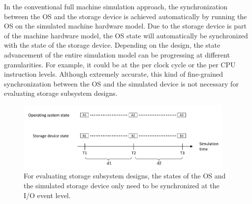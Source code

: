 In the conventional full machine simulation approach, the synchronization between the OS and the storage device is achieved automatically by running the OS on the simulated machine hardware model. Due to the storage device is part of the machine hardware model, the OS state will automatically be synchronized with the state of the storage device. Depending on the design, the state advancement of the entire simulation model can be progressing at different granularities. For example, it could be at the per clock cycle or the per CPU instruction levels. Although extremely accurate, this kind of fine-grained synchronization between the OS and the simulated device is not necessary for evaluating storage subsystem designs.

\begin{figure}[htpb]
	\centering
	\includegraphics[width=0.95\textwidth]{figures/ch3-sychronization-granularity.pdf}
	\caption[Synchronization between the OS and the simulated storage device.]{\label{fig:ch3-sychronization-granularity}For evaluating storage subsystem designs, the states of the OS and the simulated storage device only need to be synchronized at the I/O event level.}
\end{figure}

